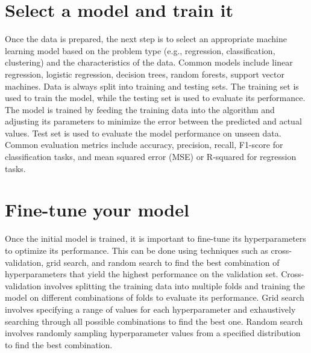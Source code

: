 \documentclass{article}
\begin{document}
\section{Select a model and train it}
Once the data is prepared, the next step is to select an appropriate machine learning model based on the problem type (e.g., regression, classification, clustering) and the characteristics of the data. Common models include linear regression, logistic regression, decision trees, random forests, support vector machines.
Data is always split into training and testing sets. The training set is used to train the model, while the testing set is used to evaluate its performance. The model is trained by feeding the training data into the algorithm and adjusting its parameters to minimize the error between the predicted and actual values.
Test set is used to evaluate the model performance on unseen data. Common evaluation metrics include accuracy, precision, recall, F1-score for classification tasks, and mean squared error (MSE) or R-squared for regression tasks.
\section{Fine-tune your model}
Once the initial model is trained, it is important to fine-tune its hyperparameters to optimize its performance. This can be done using techniques such as cross-validation, grid search, and random search
to find the best combination of hyperparameters that yield the highest performance on the validation set.
Cross-validation involves splitting the training data into multiple folds and training the model on different combinations of folds to evaluate its performance. Grid search involves specifying a range of values for each hyperparameter and exhaustively searching through all possible combinations to find the best one. Random search involves randomly sampling hyperparameter values from a specified distribution to find the best combination.
\end{document}
